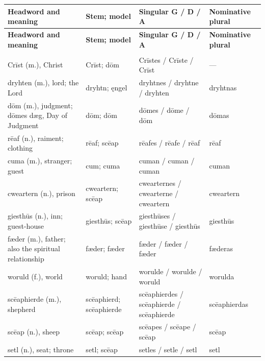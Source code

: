 \begin{longtable}{@{}>{\raggedright\arraybackslash}p{37.19mm}>{\raggedright\arraybackslash}p{22.35mm}>{\raggedright\arraybackslash}p{33.52mm}>{\raggedright\arraybackslash}p{22.5mm}@{}}
\toprule
\textbf{Headword and meaning} & \textbf{Stem; model} & \textbf{Singular G /\allowbreak{} D /\allowbreak{} A} & \textbf{Nominative plural} \\
\midrule
\endfirsthead
\toprule
\textbf{Headword and meaning} & \textbf{Stem; model} & \textbf{Singular G /\allowbreak{} D /\allowbreak{} A} & \textbf{Nominative plural} \\
\midrule
\endhead
\midrule
\multicolumn{4}{r}{\footnotesize Continued on the following page.}\\
\endfoot
\bottomrule
\endlastfoot
Crīst (m.), Christ & Crīst; dōm & Crīstes /\allowbreak{} Crīste /\allowbreak{} Crīst & — \\
dryhten (m.), lord; the Lord & dryhtn; ęngel & dryhtnes /\allowbreak{} dryhtne /\allowbreak{} dryhten & dryhtnas \\
dōm (m.), judgment; dōmes dæg, Day of Judgment & dōm; dōm & dōmes /\allowbreak{} dōme /\allowbreak{} dōm & dōmas \\
rēaf (n.), raiment; clothing & rēaf; scēap & rēafes /\allowbreak{} rēafe /\allowbreak{} rēaf & rēaf \\
cuma (m.), stranger; guest & cum; cuma & cuman /\allowbreak{} cuman /\allowbreak{} cuman & cuman \\
cweartern (n.), prison & cweartern; scēap & cwearternes /\allowbreak{} cwearterne /\allowbreak{} cweartern & cweartern \\
giesthūs (n.), inn; guest-house & giesthūs; scēap & giesthūses /\allowbreak{} giesthūse /\allowbreak{} giesthūs & giesthūs \\
fæder (m.), father; also the spiritual relationship & fæder; fæder & fæder /\allowbreak{} fæder /\allowbreak{} fæder & fæderas \\
woruld (f.), world & woruld; hand & worulde /\allowbreak{} worulde /\allowbreak{} woruld & worulda \\
scēaphierde (m.), shepherd & scēaphierd; scēaphierde & scēaphierdes /\allowbreak{} scēaphierde /\allowbreak{} scēaphierde & scēaphierdas \\
scēap (n.), sheep & scēap; scēap & scēapes /\allowbreak{} scēape /\allowbreak{} scēap & scēap \\
setl (n.), seat; throne & setl; scēap & setles /\allowbreak{} setle /\allowbreak{} setl & setl \\

\end{longtable}
